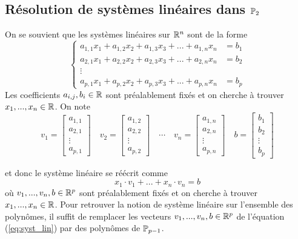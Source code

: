\subsection{Résolution de systèmes linéaires dans $\P_2$}
\label{sec:poly_lin_syst}
On se souvient que les systèmes linéaires sur $\R^n$ sont de la forme 
$$\begin{cases} a_{1,1}x_1 + a_{1,2}x_2 + a_{1,3}x_3 + ... + a_{1, n}x_n &= b_1 \\ a_{2,1}x_1 + a_{2,2}x_2 + a_{2,3}x_3 + ... + a_{2, n}x_n &= b_2 \\ \vdots \\ a_{p,1}x_1 + a_{p,2}x_2 + a_{p,3}x_3 + ... + a_{p, n}x_n &= b_p \end{cases}$$
Les coefficients $a_{i,j}, b_i \in \R$ sont préalablement fixés et on cherche à trouver $x_1,...,x_n \in \R$. On note
$$v_1 = \begin{bmatrix}
a_{1,1} \\ a_{2,1} \\ \vdots \\ a_{p,1}
\end{bmatrix} \quad 
v_2 = \begin{bmatrix}
a_{1,2} \\ a_{2,2} \\ \vdots \\ a_{p,2}
\end{bmatrix} \quad \cdots \quad
v_{n} =  \begin{bmatrix}
a_{1,n} \\ a_{2,n} \\ \vdots \\ a_{p,n}
\end{bmatrix} \quad 
b = \begin{bmatrix}
b_1 \\ b_2 \\ \vdots \\ b_{p}
\end{bmatrix}$$

et donc le système linéaire se réécrit comme
\begin{equation}
    x_1 \cdot v_1 + ... + x_n \cdot v_n = b
    \label{eq:syst_lin}
\end{equation}
où $v_1,...,v_n,b \in \R^p$ sont préalablement fixés et on cherche à trouver $x_1,...,x_n \in \R$. Pour retrouver la notion de système linéaire sur l'ensemble des polynômes, il suffit de remplacer les vecteurs $v_1,...,v_n,b \in \R^p$ de l'équation (\ref{eq:syst_lin}) par des polynômes de $\P_{p-1}$.

